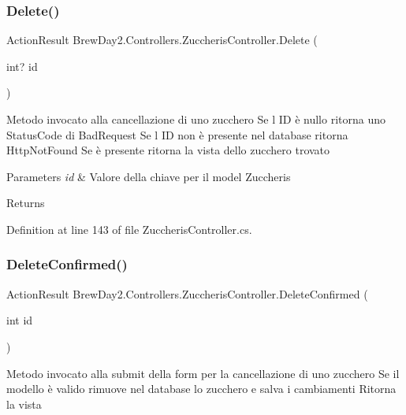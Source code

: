 \subsubsection{\texorpdfstring{Delete()}{Delete()}}
{\footnotesize\ttfamily Action\+Result Brew\+Day2.\+Controllers.\+Zuccheris\+Controller.\+Delete (\begin{DoxyParamCaption}\item[{int?}]{id }\end{DoxyParamCaption})}



Metodo invocato alla cancellazione di uno zucchero Se l\textquotesingle{} ID è nullo ritorna uno Status\+Code di Bad\+Request Se l\textquotesingle{} ID non è presente nel database ritorna Http\+Not\+Found Se è presente ritorna la vista dello zucchero trovato 


\begin{DoxyParams}{Parameters}
{\em id} & Valore della chiave per il model Zuccheris\\
\hline
\end{DoxyParams}
\begin{DoxyReturn}{Returns}

\end{DoxyReturn}


Definition at line 143 of file Zuccheris\+Controller.\+cs.

\mbox{\label{class_brew_day2_1_1_controllers_1_1_zuccheris_controller_a69bc9afa9b5e056977c31dd50da54964}} 
\subsubsection{\texorpdfstring{Delete\+Confirmed()}{DeleteConfirmed()}}
{\footnotesize\ttfamily Action\+Result Brew\+Day2.\+Controllers.\+Zuccheris\+Controller.\+Delete\+Confirmed (\begin{DoxyParamCaption}\item[{int}]{id }\end{DoxyParamCaption})}



Metodo invocato alla submit della form per la cancellazione di uno zucchero Se il modello è valido rimuove nel database lo zucchero e salva i cambiamenti Ritorna la vista 


